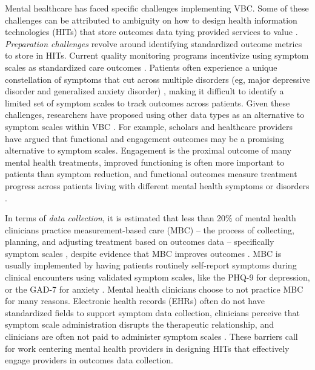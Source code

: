 Mental healthcare has faced specific challenges implementing VBC.
Some of these challenges can be attributed to ambiguity on how to design health information technologies (HITs) that store outcomes data tying provided services to value \cite{world_economic_forum_value_2017}.
\textit{Preparation challenges} revolve around identifying standardized outcome metrics to store in HITs.
Current quality monitoring programs incentivize using symptom scales as standardized care outcomes \cite{morden_health_2022}.
Patients often experience a unique constellation of symptoms that cut across multiple disorders (eg, major depressive disorder and generalized anxiety disorder) \cite{boschloo_network_2015, cramer_comorbidity_2010, barkham_routine_2023}, making it difficult to identify a limited set of symptom scales to track outcomes across patients.
Given these challenges, researchers have proposed using other data types as an alternative to symptom scales within VBC \cite{hobbs_knutson_driving_2021, oslin_provider_2019}. 
For example, scholars and healthcare providers have argued that functional and engagement outcomes may be a promising alternative to symptom scales. 
Engagement is the proximal outcome of many mental health treatments, improved functioning is often more important to patients than symptom reduction, and functional outcomes measure treatment progress across patients living with different mental health symptoms or disorders \cite{stewart_can_2017, tauscher_what_2021, pincus_quality_2016}.

In terms of \textit{data collection}, it is estimated that less than 20\% of mental health clinicians practice measurement-based care (MBC) -- the process of collecting, planning, and adjusting treatment based on outcomes data -- specifically symptom scales \cite{zimmerman_why_2008, fortney_tipping_2017}, despite evidence that MBC improves outcomes \cite{barkham_routine_2023}. 
MBC is usually implemented by having patients routinely self-report symptoms during clinical encounters using validated symptom scales, like the PHQ-9 for depression, or the GAD-7 for anxiety \cite{wray_enhancing_2018}.
Mental health clinicians choose to not practice MBC for many reasons. 
Electronic health records (EHRs) often do not have standardized fields to support symptom data collection, clinicians perceive that symptom scale administration disrupts the therapeutic relationship, and clinicians are often not paid to administer symptom scales \cite{lewis_implementing_2019, desimone_impact_2023, oslin_provider_2019}.
These barriers call for work centering mental health providers in designing HITs that effectively engage providers in outcomes data collection.

